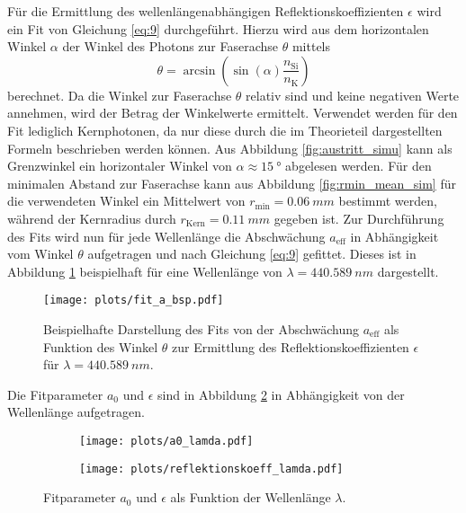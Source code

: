 Für die Ermittlung des wellenlängenabhängigen Reflektionskoeffizienten $\epsilon$ wird ein Fit von Gleichung \eqref{eq:9} durchgeführt. Hierzu wird aus dem horizontalen Winkel $\alpha$ der Winkel des Photons zur Faserachse $\theta$ mittels 
\begin{equation}
    \theta = \arcsin \left( \sin(\alpha)\frac{n_\mathrm{Si}}{n_\mathrm{K}}\right)
    \label{eq:theta}
\end{equation}
berechnet. Da die Winkel zur Faserachse $\theta$ relativ sind und keine negativen Werte annehmen, wird der Betrag der Winkelwerte ermittelt. Verwendet werden für den Fit lediglich Kernphotonen, da nur diese durch die im Theorieteil dargestellten Formeln beschrieben werden können. Aus Abbildung \ref{fig:austritt_simu} kann als Grenzwinkel ein horizontaler Winkel von $\alpha \approx \SI{15}{°}$ abgelesen werden.
Für den minimalen Abstand zur Faserachse kann aus Abbildung \ref{fig:rmin_mean_sim} für die verwendeten Winkel ein Mittelwert von $r_\mathrm{min} = \SI{0.06}{mm}$ bestimmt werden, während der Kernradius durch $r_\mathrm{Kern} = \SI{0.11}{mm}$ \cite{anleitung} gegeben ist.
Zur Durchführung des Fits wird nun für jede Wellenlänge die Abschwächung $a_\mathrm{eff}$ in Abhängigkeit vom Winkel $\theta$ aufgetragen und nach Gleichung \eqref{eq:9} gefittet. Dieses ist in Abbildung \ref{fig:fit_a_bsp} beispielhaft für eine Wellenlänge von $\lambda = \SI{440.589}{nm}$ dargestellt.
\begin{figure}
    \centering
    \texttt{[image: plots/fit\_a\_bsp.pdf]}
    \caption{Beispielhafte Darstellung des Fits von der Abschwächung $a_\mathrm{eff}$ als Funktion des Winkel $\theta$ zur Ermittlung des Reflektionskoeffizienten $\epsilon$ für $\lambda = \SI{440.589}{nm}$.}
    \label{fig:fit_a_bsp}
\end{figure}
\FloatBarrier
Die Fitparameter $a_0$ und $\epsilon$ sind in Abbildung \ref{fig:a0_epsilon} in Abhängigkeit von der Wellenlänge aufgetragen.
\begin{figure}
    \begin{subfigure}[c]{0.5\textwidth}    
        \texttt{[image: plots/a0\_lamda.pdf]}
    \end{subfigure}
    \begin{subfigure}[c]{0.5\textwidth}
        \texttt{[image: plots/reflektionskoeff\_lamda.pdf]}
    \end{subfigure}
    \caption{Fitparameter $a_0$ und $\epsilon$ als Funktion der Wellenlänge $\lambda$.}
    \label{fig:a0_epsilon}
\end{figure}
\FloatBarrier

